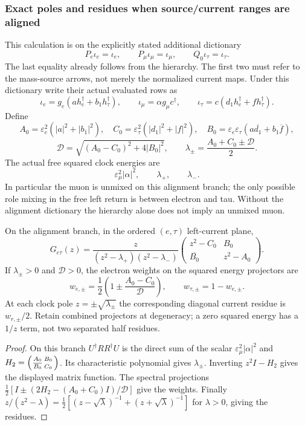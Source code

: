 \documentclass[11pt,a4paper]{article}
\begin{document}
\subsubsection{Exact poles and residues when source/current ranges are aligned}
This calculation is on the explicitly stated additional dictionary
\[
 P_e\iota_e=\iota_e,\qquad
 P_\mu\iota_\mu=\iota_\mu,\qquad Q_0\iota_\tau=\iota_\tau.
\]
The last equality already follows from the hierarchy. The first two must
refer to the mass-source arrows, not merely the normalized current maps.
Under this dictionary write their actual evaluated rows as
\[
 \iota_e=g_e(a h_e^\dagger+b_1h_\tau^\dagger),\qquad
 \iota_\mu=\alpha g_\mu c^\dagger,\qquad
 \iota_\tau=c(d_1h_e^\dagger+f h_\tau^\dagger).
\]
Define
\[
 A_0=\varepsilon_e^2(|a|^2+|b_1|^2),\quad
 C_0=\varepsilon_\tau^2(|d_1|^2+|f|^2),\quad
 B_0=\varepsilon_e\varepsilon_\tau
       (a\overline{d_1}+b_1\overline f),
\]
\[
 \mathscr D=\sqrt{(A_0-C_0)^2+4|B_0|^2},\qquad
 \lambda_\pm=\frac{A_0+C_0\pm\mathscr D}{2}.
\]
The actual free squared clock energies are
\[
 \boxed{\varepsilon_\mu^2|\alpha|^2,\qquad\lambda_+,\qquad\lambda_-.}
\]
In particular the muon is unmixed on this alignment branch; the only possible
role mixing in the free left return is between electron and tau. Without the
alignment dictionary the hierarchy alone does not imply an unmixed muon.

\begin{theorem}
\label{p3f:thm:v2168-aligned-mixed-poles}
On the alignment branch, in the ordered $(e,\tau)$ left-current plane,
\[
 \boxed{G_{e\tau}(z)=
 \frac{z}{(z^2-\lambda_+)(z^2-\lambda_-)}
 \begin{pmatrix}z^2-C_0&B_0\\\overline{B_0}&z^2-A_0\end{pmatrix}.}
\]
If $\lambda_\pm>0$ and $\mathscr D>0$, the electron weights on the squared
energy projectors are
\[
 w_{e,\pm}=\frac12\left(1\pm\frac{A_0-C_0}{\mathscr D}\right),
 \qquad w_{\tau,\pm}=1-w_{e,\pm}.
\]
At each clock pole $z=\pm\sqrt{\lambda_\pm}$ the corresponding diagonal
current residue is $w_{r,\pm}/2$. Retain combined projectors at degeneracy;
a zero squared energy has a $1/z$ term, not two separated half residues.
\end{theorem}
\begin{proof}
On this branch $U^\dagger RR^\dagger U$ is the direct sum of the scalar
$\varepsilon_\mu^2|\alpha|^2$ and
$H_2=\begin{psmallmatrix}A_0&B_0\\\overline{B_0}&C_0\end{psmallmatrix}$.
Its characteristic polynomial gives $\lambda_\pm$. Inverting $z^2I-H_2$
gives the displayed matrix function. The spectral projections
$\frac12[I\pm(2H_2-(A_0+C_0)I)/\mathscr D]$ give the weights. Finally
$z/(z^2-\lambda)=\frac12[(z-\sqrt\lambda)^{-1}+
(z+\sqrt\lambda)^{-1}]$ for $\lambda>0$, giving the residues.
\end{proof}
\end{document}
